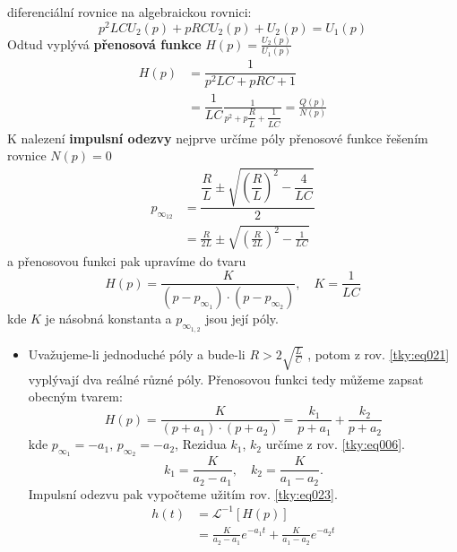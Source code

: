 \begin{tkyexam}
  diferenciální rovnice na algebraickou rovnici:
  \begin{equation*}
    p^2LCU_2(p)+pRCU_2(p)+U_2(p)=U_1(p)
  \end{equation*}
  Odtud vyplývá \textbf{přenosová funkce} $H(p)=\frac{U_2(p)}{U_1(p)}$
  \begin{align}
    H(p) &=\dfrac{1}{p^2LC+pRC+1}                                   \nonumber \\
          &=\dfrac{1}{LC}\frac{1}{p^2+p\dfrac{R}{L}+\dfrac{1}{LC}}
          =\frac{Q(p)}{N(p)}                                        \label{tky:eq020}
  \end{align}
  K nalezení \textbf{impulsní odezvy} nejprve určíme póly přenosové funkce řešením rovnice
  $N(p)=0$
  \begin{align}
    p_{\infty_{12}} 
      &=\dfrac{\dfrac{R}{L}\pm\sqrt{\left(\dfrac{R}{L}\right)^2-\dfrac{4}{LC}}}{2}   \nonumber \\
      &=\frac{R}{2L}\pm\sqrt{\left(\frac{R}{2L}\right)^2-\frac{1}{LC}}          \label{tky:eq021}
  \end{align}
  a přenosovou funkci pak upravíme do tvaru
  \begin{equation*}
    H(p)=\frac{K}{(p-p_{\infty_1})\cdot(p-p_{\infty_2})}, \quad K=\frac{1}{LC}
  \end{equation*}
  kde \(K\) je násobná konstanta a \(p_{\infty_{1,2}}\) jsou její póly. 
  \begin{itemize}[leftmargin=12pt,noitemsep]
    \item Uvažujeme-li jednoduché póly a bude-li $R>2\sqrt{\frac{L}{C}}$ , potom z  rov.
          \ref{tky:eq021} vyplývají dva reálné různé póly. Přenosovou funkci tedy můžeme
          zapsat obecným tvarem:
          \begin{equation*}
            H(p)=\frac{K}{(p+a_1)\cdot(p+a_2)}=\frac{k_1}{p+a_1}+\frac{k_2}{p+a_2}
          \end{equation*}
          kde $p_{\infty_1}=-a_1,\, p_{\infty_2}=-a_2$, Rezidua  \(k_1\), \(k_2\) určíme z rov.
          \ref{tky:eq006}. 
          \begin{equation*}
            k_1=\frac{K}{a_2-a_1}, \quad k_2=\frac{K}{a_1-a_2}.
          \end{equation*}
          Impulsní odezvu pak vypočteme užitím rov. \ref{tky:eq023}.
          \begin{align*}
            h(t)&=\mathcal{L}^{-1}[H(p)]               \\
                &=\frac{K}{a_2-a_1}e^{-a_1t}+\frac{K}{a_1-a_2}e^{-a_2t}

\end{align*}
\end{itemize}
\end{tkyexam}
